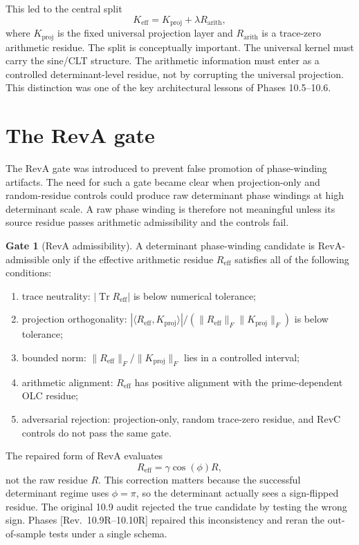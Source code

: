 \documentclass[11pt]{article}
\newcommand{\Rarith}{R_{\mathrm{arith}}}
\newcommand{\Kproj}{K_{\mathrm{proj}}}
\newcommand{\Keff}{K_{\mathrm{eff}}}
\newcommand{\Tr}{\operatorname{Tr}}
\newcommand{\revtag}[1]{\textnormal{[Rev.~#1]}}
\theoremstyle{definition}
\newtheorem{gate}{Gate}
\theoremstyle{plain}
\begin{document}
This led to the central split
\begin{equation}
  \Keff = \Kproj + \lambda\Rarith,
\end{equation}
where $\Kproj$ is the fixed universal projection layer and $\Rarith$ is a trace-zero arithmetic residue.  The split is conceptually important.  The universal kernel must carry the sine/CLT structure.  The arithmetic information must enter as a controlled determinant-level residue, not by corrupting the universal projection.  This distinction was one of the key architectural lessons of Phases 10.5--10.6.

\section{The RevA gate}

The RevA gate was introduced to prevent false promotion of phase-winding artifacts.  The need for such a gate became clear when projection-only and random-residue controls could produce raw determinant phase windings at high determinant scale.  A raw phase winding is therefore not meaningful unless its source residue passes arithmetic admissibility and the controls fail.

\begin{gate}[RevA admissibility]
A determinant phase-winding candidate is RevA-admissible only if the effective arithmetic residue $R_{\mathrm{eff}}$ satisfies all of the following conditions:
\begin{enumerate}[label=(\roman*)]
  \item trace neutrality: $|\Tr R_{\mathrm{eff}}|$ is below numerical tolerance;
  \item projection orthogonality: $|\langle R_{\mathrm{eff}},\Kproj\rangle|/(\|R_{\mathrm{eff}}\|_F\|\Kproj\|_F)$ is below tolerance;
  \item bounded norm: $\|R_{\mathrm{eff}}\|_F/\|\Kproj\|_F$ lies in a controlled interval;
  \item arithmetic alignment: $R_{\mathrm{eff}}$ has positive alignment with the prime-dependent OLC residue;
  \item adversarial rejection: projection-only, random trace-zero residue, and RevC controls do not pass the same gate.
\end{enumerate}
\end{gate}

The repaired form of RevA evaluates
\begin{equation}
  R_{\mathrm{eff}}=\gamma\cos(\phi)R,
\end{equation}
not the raw residue $R$.  This correction matters because the successful determinant regime uses $\phi=\pi$, so the determinant actually sees a sign-flipped residue.  The original 10.9 audit rejected the true candidate by testing the wrong sign.  Phases \revtag{10.9R--10.10R} repaired this inconsistency and reran the out-of-sample tests under a single schema.
\end{document}
